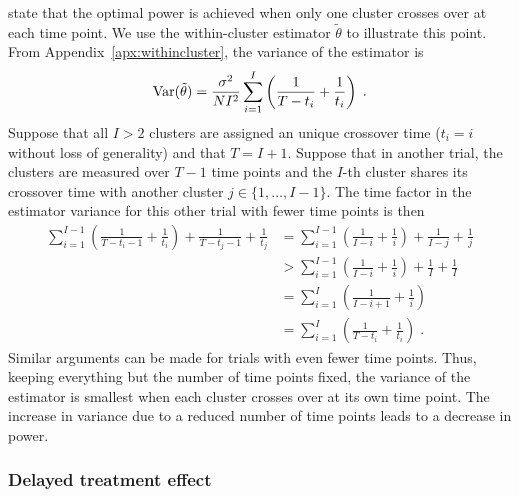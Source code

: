 \documentclass[10pt]{article}
\begin{document}
\textcite{Hussey:2007} state that the optimal power is achieved when only one cluster crosses over at each time point. We use the within-cluster estimator $\tilde{\theta}$ to illustrate this point. From Appendix~\ref{apx:withincluster}, the variance of the estimator is
\[
\mathrm{Var}(\tilde{\theta}) = \frac{\sigma^2}{NI^2}\sum_{i=1}^I\left(\frac{1}{T-t_i} + \frac{1}{t_i}\right) \;.
\]
Suppose that all $I>2$ clusters are assigned an unique crossover time ($t_i=i$ without loss of generality) and that $T=I+1$. Suppose that in another trial, the clusters are measured over $T-1$ time points and the $I$-th cluster shares its crossover time with another cluster $j\in\{1,\ldots,I-1\}$. The time factor in the estimator variance for this other trial with fewer time points is then
\begin{align*}
\sum_{i=1}^{I-1}\left(\frac{1}{T-t_i-1} + \frac{1}{t_i}\right) + \frac{1}{T-t_j-1} + \frac{1}{t_j} &= \sum_{i=1}^{I-1}\left(\frac{1}{I-i} + \frac{1}{i}\right) + \frac{1}{I-j} + \frac{1}{j} \\
&> \sum_{i=1}^{I-1}\left(\frac{1}{I-i} + \frac{1}{i}\right) + \frac{1}{I} + \frac{1}{I} \\
&= \sum_{i=1}^I\left(\frac{1}{I-i+1}+\frac{1}{i}\right) \\
&= \sum_{i=1}^I\left(\frac{1}{T-t_i}+\frac{1}{t_i}\right) \;.
\end{align*}
Similar arguments can be made for trials with even fewer time points. Thus, keeping everything but the number of time points fixed, the variance of the estimator is smallest when each cluster crosses over at its own time point. The increase in variance due to a reduced number of time points leads to a decrease in power.

\subsubsection{Delayed treatment effect}
\end{document}
